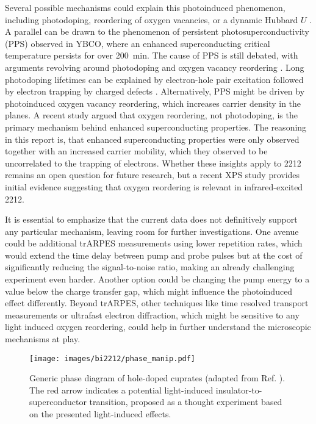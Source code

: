 Several possible mechanisms could explain this photoinduced phenomenon, including photodoping, reordering of oxygen vacancies, or a dynamic Hubbard $U$ \cite{baykusheva_ultrafast_2022}.
A parallel can be drawn to the phenomenon of persistent photosuperconductivity (PPS) observed in YBCO, where an enhanced superconducting critical temperature persists for over \qty{200}{\minute}.
The cause of PPS is still debated, with arguments revolving around photodoping and oxygen vacancy reordering \cite{gilabert_photodoping_2000}.
Long photodoping lifetimes can be explained by electron-hole pair excitation followed by electron trapping by charged defects \cite{el_hage_disentangling_2024, kudinov_persistent_1993, kudinov_mechanisms_1994}.
Alternatively, PPS might be driven by photoinduced oxygen vacancy reordering, which increases carrier density in the  planes.
A recent study \cite{el_hage_disentangling_2024} argued that oxygen reordering, not photodoping, is the primary mechanism behind enhanced superconducting properties.
The reasoning in this report is, that enhanced superconducting properties were only observed together with an increased carrier mobility, which they observed to be uncorrelated to the trapping of electrons.
Whether these insights apply to 2212 remains an open question for future research, but a recent XPS study \cite{puntel_out--equilibrium_2024} provides initial evidence suggesting that oxygen reordering is relevant in infrared-excited 2212.

It is essential to emphasize that the current data does not definitively support any particular mechanism, leaving room for further investigations.
One avenue could be additional trARPES measurements using lower repetition rates, which would extend the time delay between pump and probe pulses but at the cost of significantly reducing the signal-to-noise ratio, making an already challenging experiment even harder.
Another option could be changing the pump energy to a value below the charge transfer gap, which might influence the photoinduced effect differently.
Beyond trARPES, other techniques like time resolved transport measurements or ultrafast electron diffraction, which might be sensitive to any light induced oxygen reordering, could help in further understand the microscopic mechanisms at play.

\begin{figure}[b!]
	\centering
	\texttt{[image: images/bi2212/phase\_manip.pdf]}
	\caption{Generic phase diagram of hole-doped cuprates (adapted from Ref. \cite{keimer_quantum_2015}). The red arrow indicates a potential light-induced insulator-to-superconductor transition, proposed as a thought experiment based on the presented light-induced effects.}
	\label{fig:phasemanip}
\end{figure}

